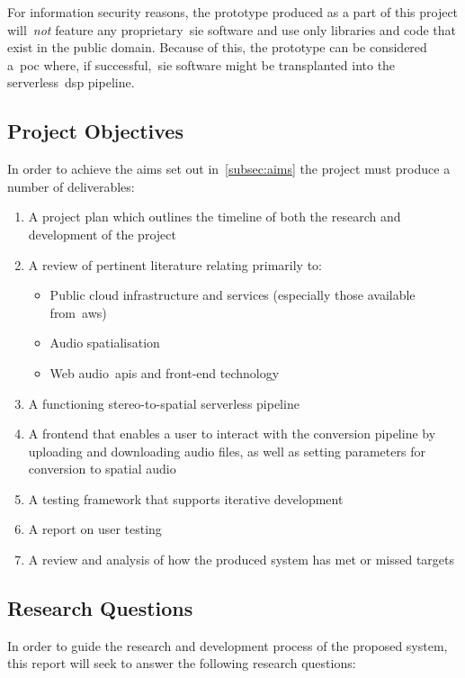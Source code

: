 For information security reasons, the prototype produced as a part of this project will~\textit{not} feature any proprietary~\gls{sie} software and use only libraries and code that exist in the public domain.
Because of this, the prototype can be considered a~\gls{poc} where, if successful,~\gls{sie} software might be transplanted into the serverless~\gls{dsp} pipeline.

\subsection{Project Objectives}\label{subsec:project-objectives}

In order to achieve the aims set out in~\ref{subsec:aims} the project must produce a number of deliverables:

\begin{enumerate}
    \item A project plan which outlines the timeline of both the research and development of the project
    \item A review of pertinent literature relating primarily to:
    \begin{itemize}
        \item Public cloud infrastructure and services (especially those available from~\gls{aws})
        \item Audio spatialisation
        \item Web audio~\glspl{api} and front-end technology
    \end{itemize}
    \item A functioning stereo-to-spatial serverless pipeline
    \item A frontend that enables a user to interact with the conversion pipeline by uploading and downloading audio files, as well as setting parameters for conversion to spatial audio
    \item A testing framework that supports iterative development
    \item A report on user testing
    \item A review and analysis of how the produced system has met or missed targets
\end{enumerate}

\subsection{Research Questions}\label{subsec:research-questions}

In order to guide the research and development process of the proposed system, this report will seek to answer the following research questions:


